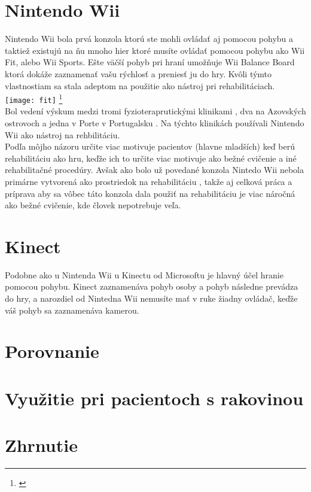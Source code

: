\documentclass{article}
\begin{document}
\section{Nintendo Wii}
Nintendo Wii bola prvá konzola ktorú ste mohli ovládať aj pomocou pohybu a taktiež existujú na ňu mnoho hier ktoré musíte ovládať pomocou pohybu ako Wii Fit, alebo Wii Sports. Ešte väčší pohyb pri hraní umožňuje Wii Balance Board ktorá dokáže zaznamenať vašu rýchlosť a preniesť ju do hry. Kvôli týmto vlastnostiam sa stala adeptom na použitie ako nástroj pri rehabilitáciach. 
\texttt{[image: fit]}
\thanks{\cite{medsci10010013}}\\
Bol vedení výskum medzi tromi fyzioteraprutickými klinikami , dva na Azovských ostrovoch a jedna v Porte v Portugalsku \cite{Simas:Videogames}. Na týchto klinikách používali Nintendo Wii ako nástroj na rehbilitáciu.
\\Podľa môjho názoru určite viac motivuje pacientov (hlavne mladších) keď berú rehabilitáciu ako hru, keďže ich to určite viac motivuje ako bežné cvičenie a iné rehabilitačné procedúry. Avšak ako bolo už povedané konzola Nintedo Wii nebola primárne vytvorená ako prostriedok na rehabilitáciu , takže aj celková práca a príprava aby sa vôbec táto konzola dala použiť na rehabilitáciu je viac náročná ako bežné cvičenie, kde človek nepotrebuje veľa. 
\section{Kinect}
Podobne ako u Nintenda Wii u Kinectu od Microsoftu je hlavný účel hranie pomocou pohybu. Kinect zaznamenáva pohyb osoby a pohyb následne prevádza do hry, a narozdiel od Nintedna Wii nemusíte mať v ruke žiadny ovládač, keďže váš pohyb sa zaznamenáva kamerou. 
\section{Porovnanie}



\section{Využitie pri pacientoch s rakovinou} 
\section{Zhrnutie}




\end{document}
